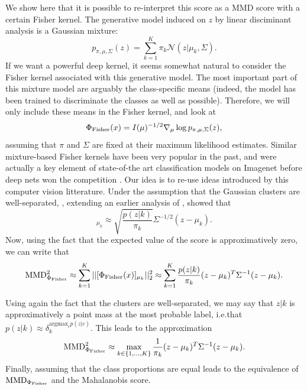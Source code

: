 {We show here that it is possible to re-interpret this score as a MMD score with a certain Fisher kernel. 
The generative model induced on $z$ by linear disciminant analysis is a Gaussian mixture:
\begin{equation}
    p_{\pi, \mu , \Sigma }(z) = \sum_{k=1}^K \pi_k \mathcal{N}(z | \mu_k, \Sigma).
\end{equation}
If we want a powerful deep kernel, it seems somewhat natural to consider the Fisher kernel associated with this generative model. The most important part of this mixture model are arguably the class-specific means (indeed, the model has been trained to discriminate the classes as well as possible). Therefore, we will only include these means in the Fisher kernel, and look at
\begin{equation}
	\Phi_\textup{Fisher} (x) = I(\mu)^{-1/2} \nabla_\mu  \log p_{\pi, \mu , \Sigma }(z),
\end{equation}
assuming that $\pi$ and $\Sigma$ are fixed at their maximum likelihood estimates. Similar mixture-based Fisher kernels have been very popular in the past, and were actually a key element of state-of-the art classification models on Imagenet before deep nets won the competition \citep{perronnin2010improving}. Our idea is to re-use ideas introduced by this computer vision litterature. Under the assumption that the Gaussian clusters are well-separated, \textcite{tanaka2013fisher}, extending an earlier analysis of \textcite[Appendix A]{sanchez2013image}, showed that
\begin{equation}
	[\Phi_\textup{Fisher} (x)]_{\mu_k} \approx \sqrt{\frac{p(z|k)}{\pi_k }}  \Sigma^{-1/2} (z - \mu_k).
\end{equation}
Now, using the fact that the expected value of the score is approximatively zero, we can write that
\begin{equation}
    \textup{MMD}_{\Phi_\textup{Fisher}}^2 \approx \sum_{k=1}^K  || [\Phi_\textup{Fisher} (x)]_{\mu_k} ||_2^2 \approx \sum_{k=1}^K \frac{p(z|k)}{\pi_k} (z - \mu_k)^T \Sigma^{-1} (z - \mu_k).
\end{equation}



Using again the fact that the clusters are well-separated, we may say that $z|k$ is approximatively a point mass at the most probable label,  i.e.\@ that $p(z|k) \approx \delta_k^{\text{argmax}_c p(z|c)}$. This leads to the approximation 
\begin{equation}
    \textup{MMD}_{\Phi_\textup{Fisher}}^2 \approx \max_{k \in \{1,...,K\}} \frac{1}{\pi_k} (z - \mu_k)^T \Sigma^{-1} (z - \mu_k).
\end{equation}
Finally, assuming that the class proportions are equal leads to the equivalence of $\textup{MMD}_{\Phi_\textup{Fisher}}$ and the Mahalanobis score.




}

